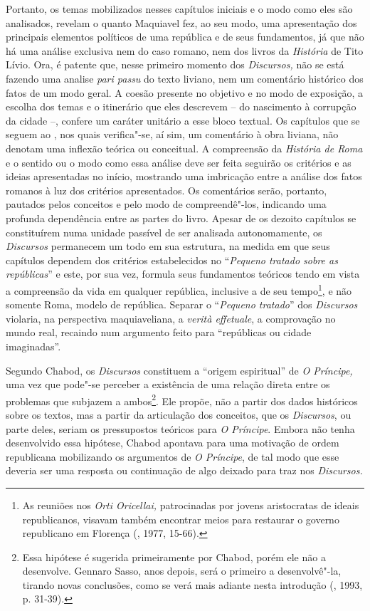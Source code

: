 Portanto, os temas mobilizados nesses capítulos iniciais e o modo como
eles são analisados, revelam o quanto Maquiavel fez, ao seu modo, uma
apresentação dos principais elementos políticos de uma república e de
seus fundamentos, já que não há uma análise exclusiva nem do caso
romano, nem dos livros da \emph{História} de Tito Lívio. Ora, é patente
que, nesse primeiro momento dos \emph{Discursos,} não se está fazendo
uma analise \emph{pari passu} do texto liviano, nem um comentário
histórico dos fatos de um modo geral. A coesão presente no objetivo e no
modo de exposição, a escolha dos temas e o itinerário que eles descrevem
-- do nascimento à corrupção da cidade --, confere um caráter unitário a
esse bloco textual. Os capítulos que se seguem ao , nos quais
verifica"-se, aí sim, um comentário à obra liviana, não denotam uma
inflexão teórica ou conceitual. A compreensão da \emph{História de Roma}
e o sentido ou o modo como essa análise deve ser feita seguirão os
critérios e as ideias apresentadas no início, mostrando uma imbricação
entre a análise dos fatos romanos à luz dos critérios apresentados. Os
comentários serão, portanto, pautados pelos conceitos e pelo modo de
compreendê"-los, indicando uma profunda dependência entre as partes do
livro. Apesar de os dezoito capítulos se constituírem numa unidade
passível de ser analisada autonomamente, os \emph{Discursos} permanecem
um todo em sua estrutura, na medida em que seus capítulos dependem dos
critérios estabelecidos no ``\emph{Pequeno tratado sobre as
repúblicas}'' e este, por sua vez, formula seus fundamentos teóricos
tendo em vista a compreensão da vida em qualquer república, inclusive a
de seu tempo\footnote{As reuniões nos \emph{Orti Oricellai,}
  patrocinadas por jovens aristocratas de ideais republicanos, visavam
  também encontrar meios para restaurar o governo republicano em
  Florença (, 1977, 15-66).}, e não somente Roma, modelo de
república. Separar o ``\emph{Pequeno tratado}'' dos \emph{Discursos}
violaria, na perspectiva maquiaveliana, a \emph{verità effetuale}, a
comprovação no mundo real, recaindo num argumento feito para
``repúblicas ou cidade imaginadas''.

Segundo Chabod, os \emph{Discursos} constituem a ``origem espiritual''
de \emph{O Príncipe,} uma vez que pode"-se perceber a existência
de uma relação direta entre os problemas que subjazem a ambos\footnote{Essa
  hipótese é sugerida primeiramente por Chabod, porém ele não a
  desenvolve. Gennaro Sasso, anos depois, será o primeiro a
  desenvolvê"-la, tirando novas conclusões, como se verá mais adiante
  nesta introdução (, 1993, p. 31-39).}. Ele propõe, não a
partir dos dados históricos sobre os textos, mas a partir da articulação
dos conceitos, que os \emph{Discursos}, ou parte deles, seriam os
pressupostos teóricos para \emph{O Príncipe}. Embora não tenha
desenvolvido essa hipótese, Chabod apontava para uma motivação de ordem
republicana mobilizando os argumentos de \emph{O Príncipe}, de
tal modo que esse deveria ser uma resposta ou continuação de algo
deixado para traz nos \emph{Discursos.}


